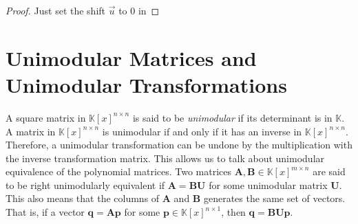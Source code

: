 \begin{proof}
Just set the shift $\vec{u}$ to 0 in 
\end{proof}
\begin{comment}
\begin{lem}
\label{lem:productDegreeBoundWithRowDegrees}If the $\vec{u}$-row
degrees of $\mathbf{A}\in\mathbb{K}\left[x\right]^{m\times n}$ are
bounded by the corresponding entries of an integer list $\vec{v}\in\mathbb{Z}^{n}$,
and the $-\vec{u}$-column degrees of $\mathbf{B}\in\mathbb{K}\left[x\right]^{n\times k}$
are bounded by $\vec{w}\in\mathbb{Z}^{k}$, then the $-\vec{v}$-column
degrees of $\mathbf{A}\mathbf{B}$ are bounded by $\vec{w}$. \end{lem}
\begin{proof}
Note that $x^{-\vec{v}}\mathbf{A}x^{\vec{u}}$ and $x^{-\vec{u}}\mathbf{B}^{-\vec{w}}$
have degrees bounded by 0. Therefore, $x^{-\vec{v}}\mathbf{A}x^{\vec{u}}x^{-\vec{u}}\mathbf{B}^{-\vec{w}}=x^{-\vec{v}}\mathbf{A}\mathbf{B}^{-\vec{w}}$
also has degree bounded by 0, or equivalently, $\cdeg_{-\vec{v}}\mathbf{A}\mathbf{B}\le\vec{w}$.
Alternatively, this also follows from the fact $\cdeg_{-\vec{v}}\mathbf{A}\le-\vec{u}$
from \prettyref{lem:productDegreeBound}.\end{proof}
\end{comment}



\section{Unimodular Matrices and Unimodular Transformations}

A square matrix in $\mathbb{K}\left[x\right]^{n\times n}$ is said
to be \emph{unimodular} if its determinant is in $\mathbb{K}$. A
matrix in $\mathbb{K}\left[x\right]^{n\times n}$ is unimodular if
and only if it has an inverse in $\mathbb{K}\left[x\right]^{n\times n}$.
Therefore, a unimodular transformation can be undone by the multiplication
with the inverse transformation matrix. This allows us to talk about
unimodular equivalence of the polynomial matrices. Two matrices $\mathbf{A},\mathbf{B}\in\mathbb{K}\left[x\right]^{m\times n}$
are said to be right unimodularly equivalent if $\mathbf{A}=\mathbf{B}\mathbf{U}$
for some unimodular matrix $\mathbf{U}$. This also means that the
columns of $\mathbf{A}$ and $\mathbf{B}$ generates the same set
of vectors. That is, if a vector $\mathbf{q}=\mathbf{A}\mathbf{p}$
for some $\mathbf{p}\in\mathbb{K}\left[x\right]^{n\times1}$, then
$\mathbf{q}=\mathbf{B}\mathbf{U}\mathbf{p}$.


